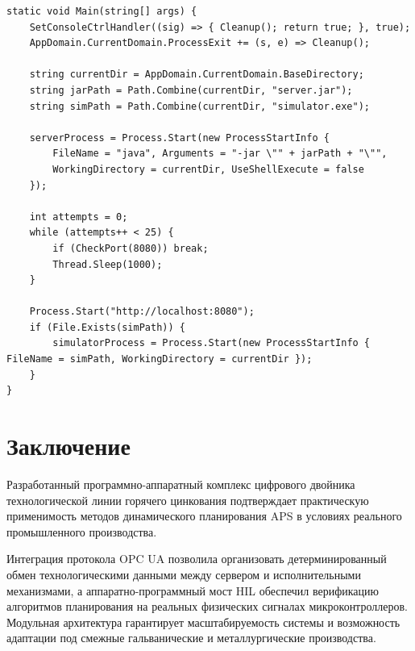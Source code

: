 \documentclass[14pt, a4paper]{extarticle}
\begin{document}
\begin{lstlisting}[language={[Sharp]C}, caption=Координация процессов в Launcher.cs]
static void Main(string[] args) {
    SetConsoleCtrlHandler((sig) => { Cleanup(); return true; }, true);
    AppDomain.CurrentDomain.ProcessExit += (s, e) => Cleanup();

    string currentDir = AppDomain.CurrentDomain.BaseDirectory;
    string jarPath = Path.Combine(currentDir, "server.jar");
    string simPath = Path.Combine(currentDir, "simulator.exe");

    serverProcess = Process.Start(new ProcessStartInfo {
        FileName = "java", Arguments = "-jar \"" + jarPath + "\"",
        WorkingDirectory = currentDir, UseShellExecute = false
    });

    int attempts = 0;
    while (attempts++ < 25) {
        if (CheckPort(8080)) break;
        Thread.Sleep(1000);
    }

    Process.Start("http://localhost:8080");
    if (File.Exists(simPath)) {
        simulatorProcess = Process.Start(new ProcessStartInfo { FileName = simPath, WorkingDirectory = currentDir });
    }
}
\end{lstlisting}

\newpage
\section{Заключение}

Разработанный программно-аппаратный комплекс цифрового двойника технологической линии горячего цинкования подтверждает практическую применимость методов динамического планирования APS в условиях реального промышленного производства. 

Интеграция протокола OPC UA позволила организовать детерминированный обмен технологическими данными между сервером и исполнительными механизмами, а аппаратно-программный мост HIL обеспечил верификацию алгоритмов планирования на реальных физических сигналах микроконтроллеров. Модульная архитектура гарантирует масштабируемость системы и возможность адаптации под смежные гальванические и металлургические производства.
\end{document}
